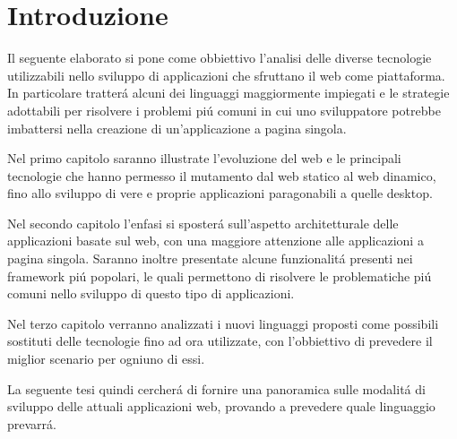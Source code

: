 



\chapter{Introduzione}
\label{ch:intro}


Il seguente elaborato si pone come obbiettivo l'analisi delle diverse tecnologie utilizzabili nello sviluppo di applicazioni che sfruttano il web come piattaforma. In particolare tratter\'a alcuni dei linguaggi maggiormente impiegati e le strategie adottabili per risolvere i problemi pi\'u comuni in cui uno sviluppatore potrebbe imbattersi nella creazione di un'applicazione a pagina singola.

Nel primo capitolo saranno illustrate l'evoluzione del web e le principali tecnologie che hanno permesso il mutamento dal web statico al web dinamico, fino allo sviluppo di vere e proprie applicazioni paragonabili a quelle desktop.

Nel secondo capitolo l'enfasi si sposter\'a sull'aspetto architetturale delle applicazioni basate sul web, con una maggiore attenzione alle applicazioni a pagina singola. Saranno inoltre presentate alcune funzionalit\'a presenti nei framework pi\'u popolari, le quali permettono di risolvere le problematiche pi\'u comuni nello sviluppo di questo tipo di applicazioni.

Nel terzo capitolo verranno analizzati i nuovi linguaggi proposti come possibili sostituti delle tecnologie fino ad ora utilizzate, con l'obbiettivo di prevedere il miglior scenario per ogniuno di essi.

La seguente tesi quindi cercher\'a di fornire una panoramica sulle modalit\'a di sviluppo delle attuali applicazioni web, provando a prevedere quale linguaggio prevarr\'a.